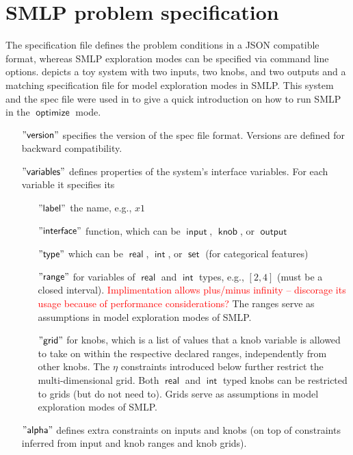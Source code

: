 \documentclass[a4paper,parskip=half]{article} %
\newcommand*\mode[1]{\operatorname{\mathsf{#1}}} %
\newcommand*\dtype[1]{\operatorname{\mathsf{#1}}} %
\newcommand*\speckey[1]{\operatorname{\mathsf{"{#1}"}}} %
\newcommand\todozk[1]{\textcolor{red}{#1}}
\newcommand*\ZK{\todozk}
\begin{document}
\section{SMLP problem specification}\label{sec:spec}

The specification file defines the problem conditions in a JSON compatible format, whereas SMLP exploration modes 
can be specified via command line options.  depicts a toy system with two inputs, two knobs, 
and two outputs and a matching specification file for model exploration modes in SMLP. This system and the spec file 
were used in  to give a quick introduction on how to run SMLP in the $\mode{optimize}$ mode.


\begin{itemize}
\item[$\speckey{version}$] specifies the version of the spec file format. Versions are defined for backward compatibility.
\item[$\speckey{variables}$] defines properties of the system's interface variables. For each variable it specifies its
\begin{itemize}
\item[$\speckey{label}$] the name, e.g., $x1$
\item[$\speckey{interface}$]  function, which can be $\dtype{input}$, $\dtype{knob}$,  or $\dtype{output}$ 
\item[$\speckey{type}$] which can be $\dtype{real}$, $\dtype{int}$, or $\dtype{set}$ (for categorical features)
\item[$\speckey{range}$]  for variables of $\dtype{real}$ and $\dtype{int}$ types, e.g., $[2,4]$ (must be a closed interval). 
\ZK{Implimentation allows plus/minus infinity -- discorage its usage because of performance considerations?}
The ranges serve as assumptions in model exploration modes of SMLP.
\item[$\speckey{grid}$] for knobs, which is a list of values that a knob variable is allowed to take on within the
 respective declared ranges, 
independently from other knobs. The $\eta$ constraints introduced below further restrict the multi-dimensional grid. 
Both $\dtype{real}$ and $\dtype{int}$ typed knobs can be restricted to grids (but do not need to).
Grids serve as assumptions in model exploration modes of SMLP.
\end{itemize}
\item[$\speckey{alpha}$] defines extra constraints on inputs and knobs 
(on top of constraints inferred from input and knob ranges and knob grids).

\end{itemize}
\end{document}
